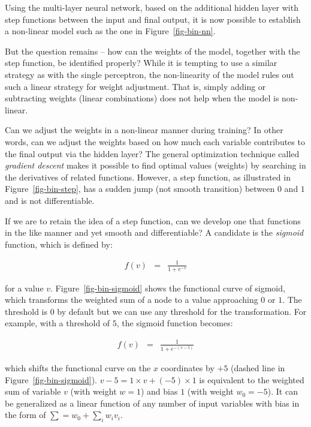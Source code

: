 \documentclass[
  letterpaper,
]{scrbook}
\begin{document}
Using the multi-layer neural network, based on the additional hidden
layer with step functions between the input and final output, it is now
possible to establish a non-linear model such as the one in
Figure~\ref{fig-bin-nn}.

But the question remains -- how can the weights of the model, together
with the step function, be identified properly? While it is tempting to
use a similar strategy as with the single perceptron, the non-linearity
of the model rules out such a linear strategy for weight adjustment.
That is, simply adding or subtracting weights (linear combinations) does
not help when the model is non-linear.

Can we adjust the weights in a non-linear manner during training? In
other words, can we adjust the weights based on how much each variable
contributes to the final output via the hidden layer? The general
optimization technique called \emph{gradient descent} makes it possible
to find optimal values (weights) by searching in the derivatives of
related functions. However, a step function, as illustrated in
Figure~\ref{fig-bin-step}, has a sudden jump (not smooth transition)
between \(0\) and \(1\) and is not differentiable.

If we are to retain the idea of a step function, can we develop one that
functions in the like manner and yet smooth and differentiable? A
candidate is the \emph{sigmoid} function, which is defined by:

\[\begin{aligned}
  f(v) & = & \frac{1}{1+e^{-v}}
\end{aligned}\]

for a value \(v\). Figure~\ref{fig-bin-sigmoid} shows the functional
curve of sigmoid, which transforms the weighted sum of a node to a value
approaching \(0\) or \(1\). The threshold is \(0\) by default but we can
use any threshold for the transformation. For example, with a threshold
of \(5\), the sigmoid function becomes:

\[\begin{aligned}
  f(v) & = & \frac{1}{1+e^{-(v-5)}}
\end{aligned}\]

which shifts the functional curve on the \(x\) coordinates by \(+5\)
(dashed line in Figure~\ref{fig-bin-sigmoid}).
\(v-5 = 1\times v + (-5)\times 1\) is equivalent to the weighted sum of
variable \(v\) (with weight \(w=1\)) and bias \(1\) (with weight
\(w_0=-5\)). It can be generalized as a linear function of any number of
input variables with bias in the form of
\(\sum = w_0 + \sum_i w_i v_i\).
\end{document}
